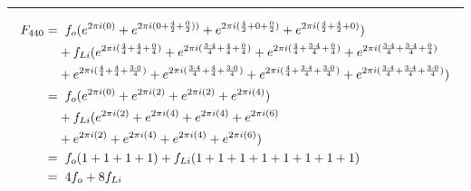 \documentclass{article}
\begin{document}
\noindent\rule{12cm}{0.4pt}
\begin{align*}
	F_{440} =& \hspace{0.2cm}  f_{o}  (e^{2 \pi i (0)} 
	+ e^{2 \pi i (0 + \frac{4}{2} + \frac{0}{2}))} 
	+ e^{2 \pi i (\frac{4}{2} + 0 + \frac{0}{2})} 
	+ e^{2 \pi i (\frac{4}{2} + \frac{4}{2} + 0)})  \\
	&+ f_{Li} (e^{2 \pi i (\frac{4}{4} + \frac{4}{4} + \frac{0}{4})}  
	+ e^{2 \pi i (\frac{3 \cdot 4}{4} + \frac{4}{4} + \frac{0}{4})} 
	+ e^{2 \pi i (\frac{4}{4} + \frac{3 \cdot 4}{4} + \frac{0}{4})} 
	+ e^{2 \pi i (\frac{3 \cdot 4}{4} + \frac{3 \cdot 4}{4} + \frac{0}{4})} \\
	&+ e^{2 \pi i (\frac{4}{4} + \frac{4}{4} + \frac{3 \cdot 0}{4})}
	+ e^{2 \pi i (\frac{3 \cdot 4}{4} + \frac{4}{4} + \frac{3 \cdot 0}{4})} 
	+ e^{2 \pi i (\frac{4}{4} + \frac{3 \cdot 4}{4} + \frac{3 \cdot 0}{4})} 
	+ e^{2 \pi i (\frac{3 \cdot 4}{4} + \frac{3 \cdot 4}{4} + \frac{3 \cdot 0}{4})}) \\  
	=& \hspace{0.2cm}  f_{o}  (e^{2 \pi i (0)} 
	+ e^{2 \pi i (2)} 
	+ e^{2 \pi i (2)} 
	+ e^{2 \pi i (4)})  \\
	&+ f_{Li} (e^{2 \pi i (2)}  
	+ e^{2 \pi i (4)} 
	+ e^{2 \pi i (4)} 
	+ e^{2 \pi i (6)} \\
	&+ e^{2 \pi i (2)}
	+ e^{2 \pi i (4)} 
	+ e^{2 \pi i (4)} 
	+ e^{2 \pi i (6)}) \\
	=& \hspace{0.2cm}  f_{o}  (1  + 1 + 1 + 1) + f_{Li}(1 + 1 + 1 + 1 + 1 + 1 + 1 + 1) \\
	=& \hspace{0.2cm} 4f_{o}   + 8f_{Li}
\end{align*}
\end{document}

